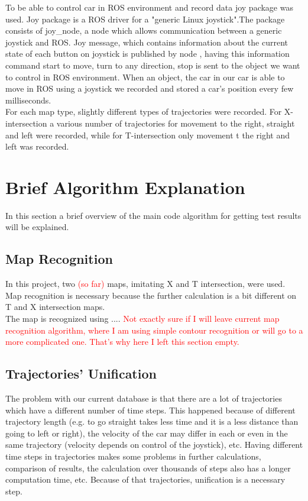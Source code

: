 To be able to control car in \gls{ROS} environment and record data joy package was used. Joy package is a \gls{ROS} driver for a "generic Linux joystick".The package consists of joy\_node, a node which allows communication between a generic joystick and \gls{ROS}. Joy message, which contains information about the current state of each button on joystick is published by node \cite{ROSjoy}, having this information command start to move, turn to any direction, stop is sent to the object we want to control in \gls{ROS} environment. When an object, the car in our car is able to move in \gls{ROS} using a joystick we recorded and stored a car's position every few milliseconds. \\

For each map type, slightly different types of trajectories were recorded. For X-intersection a various number of trajectories for movement to the right, straight and left were recorded, while for T-intersection only movement t the right and left was recorded.

\section{Brief Algorithm Explanation}

In this section a brief overview of the main code algorithm for getting test results will be explained.

\subsection{Map Recognition}

In this project, two \textcolor{red}{(so far)} maps, imitating X and T intersection, were used. Map recognition is necessary because the further calculation is a bit different on T and X intersection maps. \\
The map is recognized using .... \textcolor{red}{Not exactly sure if I will leave current map recognition algorithm, where I am using simple contour recognition or will go to a more complicated one. That's why here I left this section empty.}

\subsection{Trajectories' Unification}

The problem with our current database is that there are a lot of trajectories which have a different number of time steps. This happened because of different trajectory length (e.g. to go straight takes less time and it is a less distance than going to left or right), the velocity of the car may differ in each or even in the same trajectory (velocity depends on control of the joystick), etc. Having different time steps in trajectories makes some problems in further calculations, comparison of results, the calculation over thousands of steps also has a longer computation time, etc. Because of that trajectories, unification is a necessary step. \\

